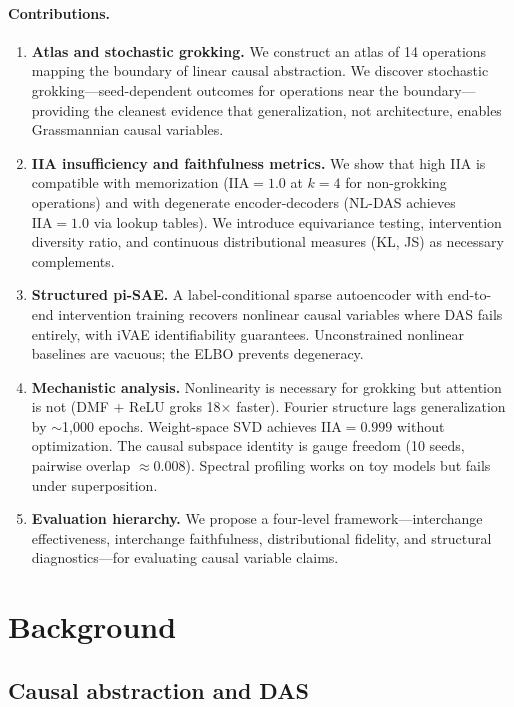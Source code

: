 \documentclass{article}
\newcommand{\IIA}{\mathrm{IIA}}
\begin{document}
\paragraph{Contributions.}
\begin{enumerate}[leftmargin=*]
\item \textbf{Atlas and stochastic grokking.} We construct an atlas of 14
  operations mapping the boundary of linear causal abstraction. We discover
  stochastic grokking---seed-dependent outcomes for operations near the
  boundary---providing the cleanest evidence that generalization, not
  architecture, enables Grassmannian causal variables.
\item \textbf{IIA insufficiency and faithfulness metrics.} We show that
  high IIA is compatible with memorization ($\IIA = 1.0$ at $k{=}4$ for
  non-grokking operations) and with degenerate encoder-decoders (NL-DAS
  achieves $\IIA = 1.0$ via lookup tables). We introduce equivariance
  testing, intervention diversity ratio, and continuous distributional
  measures (KL, JS) as necessary complements.
\item \textbf{Structured pi-SAE.} A label-conditional sparse autoencoder
  with end-to-end intervention training recovers nonlinear causal
  variables where DAS fails entirely, with iVAE identifiability guarantees.
  Unconstrained nonlinear baselines are vacuous; the ELBO prevents
  degeneracy.
\item \textbf{Mechanistic analysis.} Nonlinearity is necessary for grokking
  but attention is not (DMF + ReLU groks 18$\times$ faster). Fourier
  structure lags generalization by $\sim$1{,}000 epochs. Weight-space SVD
  achieves $\IIA = 0.999$ without optimization. The causal subspace identity
  is gauge freedom (10 seeds, pairwise overlap $\approx 0.008$). Spectral
  profiling works on toy models but fails under superposition.
\item \textbf{Evaluation hierarchy.} We propose a four-level framework---interchange effectiveness, interchange faithfulness, distributional
  fidelity, and structural diagnostics---for evaluating causal variable
  claims.
\end{enumerate}


\section{Background}
\label{sec:background}

\subsection{Causal abstraction and DAS}
\end{document}
